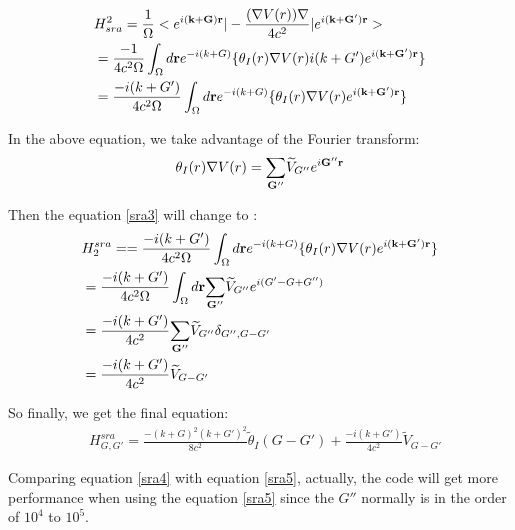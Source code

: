 \documentclass[a4paper]{report}
\begin{document}
\begin{equation}\label{sra3}
\begin{split}
&  H^{2}_{sra} = \frac{1}{\Omega} < \expg<(k+G)> |  -\frac{(\nabla{V(r)})\nabla}{4 c^2} |  \expg<(k+G')>>  \\
&  = \frac{-1}{4 {c}^2 \Omega} \int_{\Omega} d \textbf {r} e^{-i(k+G)} \{ {\theta}_{I}(r) \nabla{V(r)}    i(k+G')  \expg<(k+G')>\}  \\
&  =  \frac{-i(k+G')}{4 {c}^2 \Omega} \int_{\Omega} d \textbf {r} e^{-i(k+G)} \{ {\theta}_{I}(r) \nabla{V(r) }     \expg<(k+G')>\}  \\
\end{split}
\end{equation}

\noindent In the above equation,  we take advantage of the Fourier transform:
\begin{equation}
 {\theta}_{I}(r) \nabla{V(r )} = \sumg<G''> \widetilde{V}_{G''} \expg<G''>
\end{equation}

\noindent Then the equation \ref{sra3} will change to :
\begin{equation}\label{sra6}
\begin{split}
&  H_{2}^{sra} = = \frac{-i(k+G')}{4 {c}^2 \Omega} \int_{\Omega} d \textbf {r} e^{-i(k+G)} \{ {\theta}_{I}(r) \nabla{V(r) }     \expg<(k+G')>\}  \\
& = \frac{-i(k+G')}{4 {c}^2 \Omega} \int_{\Omega} d \textbf {r} \sumg<G''> \widetilde{V}_{G''}  e^{i(G'-G+G'')} \\
& =  \frac{-i(k+G')}{4 {c}^2 } \sumg<G''> \widetilde{V}_{G''} \delta_{G'',G-G'} \\
& = \frac{-i(k+G')}{4 {c}^2 } \widetilde{V}_{G-G'}
\end{split}
\end{equation}

\noindent So finally, we get the final equation:
\begin{equation}\label{sra5}
\begin{split}
 & H_{G,G'}^{sra} = \frac{-(k+G)^2(k+G')^2}{8 {c}^2 } \widetilde{\theta}_{I}(G-G')  +  \frac{-i(k+G')}{4 {c}^2 } \widetilde{V}_{G-G'}
\end{split}
\end{equation}

\noindent Comparing equation \ref{sra4} with equation \ref{sra5}, actually, the code will get more performance when using the equation \ref{sra5} since the $G''$ 
normally is in the order of $10^4$ to $10^5$.
\end{document}
